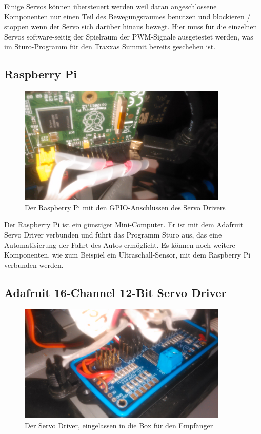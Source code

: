 \documentclass[a4paper,10pt]{scrartcl}
\begin{document}
    Einige Servos können übersteuert werden weil daran angeschlossene
    Komponenten nur einen Teil des Bewegungsraumes benutzen und blockieren /
    stoppen wenn der Servo sich darüber hinaus bewegt.
    Hier muss für die einzelnen Servos software-seitig der Spielraum der
    PWM-Signale ausgetestet werden, was im Sturo-Programm für den Traxxas Summit
    bereits geschehen ist.

    \newpage

  \subsection{Raspberry Pi}

    \begin{figure}[ht!]
      \centering
      \includegraphics[width=100mm]{pics/rpi.jpg}
      \caption{Der Raspberry Pi mit den GPIO-Anschlüssen des Servo Drivers}
    \end{figure}

    Der Raspberry Pi ist ein günstiger Mini-Computer.
    Er ist mit dem Adafruit Servo Driver verbunden und führt das Programm Sturo
    aus, das eine Automatisierung der Fahrt des Autos ermöglicht.
    Es können noch weitere Komponenten, wie zum Beispiel ein Ultraschall-Sensor,
    mit dem Raspberry Pi verbunden werden.

  \subsection{Adafruit 16-Channel 12-Bit Servo Driver}

    \begin{figure}[ht!]
      \centering
      \includegraphics[width=100mm]{pics/servo_driver.jpg}
      \caption{Der Servo Driver, eingelassen in die Box für den Empfänger}
    \end{figure}
\end{document}
